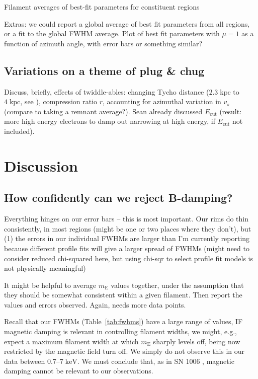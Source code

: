 \documentclass[iop, apj, numberedappendix, twocolappendix]{emulateapj}
\newcommand*{\mt}{\mathrm}
\newcommand*{\unit}[1]{\;\mt{#1}}  %
\newcommand*{\mE}{m_\mt{E}}
\newcommand*{\Ecut}{E_{\mt{cut}}}
\begin{document}
\begin{table*}[ht]
    \scriptsize
    \centering
    \caption{Filament averages of best-fit parameters for constituent regions
    \label{tab:fits-avg}}
    
\end{table*}

Extras: we could report a global average of best fit parameters from all
regions, or a fit to the global FWHM average.
Plot of best fit parameters with $\mu=1$ as a function of azimuth angle, with
error bars or something similar?

\subsection{Variations on a theme of plug \& chug}

Discuss, briefly, effects of twiddle-ables: changing Tycho distance ($2.3
\unit{kpc}$ to $4 \unit{kpc}$, see \citet{hayato2010}), compression ratio $r$,
accounting for azimuthal variation in $v_s$ (compare to taking a remnant
average?).  Sean already discussed $\Ecut$ (result: more high energy electrons
to damp out narrowing at high energy, if $\Ecut$ not included).

\section{Discussion}

\subsection{How confidently can we reject B-damping?}

Everything hinges on our error bars -- this is most important.  Our rims do
thin consistently, in most regions (might be one or two places where they
don't), but (1) the errors in our individual FWHMs are larger than I'm
currently reporting because different profile fits will give a larger spread of
FWHMs (might need to consider reduced chi-squared here, but using chi-sqr to
select profile fit models is not physically meaningful)

It might be helpful to average $\mE$ values together, under the
assumption that they should be somewhat consistent within a given filament.
Then report the values and errors observed.  Again, needs more data points.

Recall that our FWHMs (Table~\ref{tab:fwhms}) have a large range of values,
IF magnetic damping is relevant in controlling filament widths, we might, e.g.,
expect a maximum filament width at which $\mE$ sharply levels off, being now
restricted by the magnetic field turn off.  We simply do not observe this in
our data between $0.7$--$7 \unit{keV}$.  We must conclude that, as in SN 1006
, magnetic damping cannot be relevant to our
observations.
\end{document}
